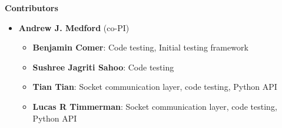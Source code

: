 \begin{frame}[allowframebreaks]{\textbf{Contributors}}
\begin{itemize}
\begin{itemize}
        \item \textbf{Lucas Erlandson}: Subspace eigensolver, DP
    \end{itemize}
    \item \textbf{Andrew J. Medford} (co-PI)
    \begin{itemize}
        \item \textbf{Benjamin Comer}: Code testing, Initial testing framework
        \item \textbf{Sushree Jagriti Sahoo}: Code testing
        \item \textbf{Tian Tian}: Socket communication layer, code testing, Python API
        \item \textbf{Lucas R Timmerman\footnotemark[2]}: Socket communication layer, code testing, Python API
    \end{itemize}
 \end{itemize}
\end{frame}


